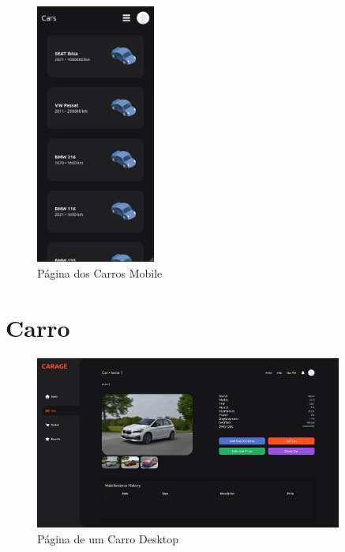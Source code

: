 \documentclass[a4paper]{report}
\begin{document}
\begin{figure}[H]
    \centering
    \includegraphics[width=0.35\textwidth]{images/cars_mobile.png}
    \caption{Página dos Carros Mobile}
\end{figure}

\section{Carro}

\begin{figure}[H]
    \centering
    \includegraphics[width=0.9\textwidth]{images/car.png}
    \caption{Página de um Carro Desktop}
\end{figure}
\end{document}
